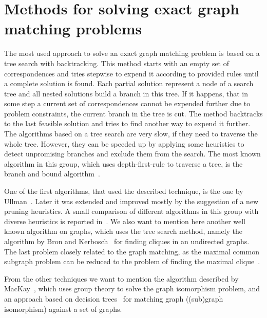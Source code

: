 \section{Methods for solving exact graph matching problems}
The most used approach to solve an exact graph matching problem is based on a tree search with backtracking. This method starts with an empty set of correspondences and tries stepwise to expend it according to provided rules until a complete solution is found. Each partial solution represent a node of a search tree and all nested solutions build a branch in this tree. If it happens, that in some step a current set of correspondences cannot be expended further due to problem constraints, the current branch in the tree is cut. The method backtracks to the last feasible solution and tries to find another way to expend it further. The algorithms based on a tree search are very slow, if they need to traverse the whole tree. However, they can be speeded up by applying some heuristics to detect unpromising branches and exclude them from the search. The most known algorithm in this group, which uses depth-first-rule to traverse a tree, is the branch and bound algorithm~\cite{Reingold}.

One of the first algorithms, that used the described technique, is the one by Ullman~\cite{Ullmann}. Later it was extended and improved mostly by the suggestion of a new pruning heuristics. A small comparison of different algorithms in this group with diverse heuristics is reported in~\cite{Lee2013}. We also want to mention here another well known algorithm on graphs, which uses the tree search method, namely the algorithm by Bron and Kerbosch~\cite{BronKerbosch} for finding cliques in an undirected graphs. The last problem closely related to the graph matching, as the maximal common subgraph problem can be reduced to the problem of finding the maximal clique~\cite{Garey_NPComplet}.

From the other techniques we want to mention the algorithm described by MacKay~\cite{McKay}, which uses group theory to solve the graph isomorphism problem, and an approach based on decision trees~\cite{Messmer1999,Shearer2001,Shearer1998} for matching graph ((sub)graph isomorphism) against a set of graphs.
